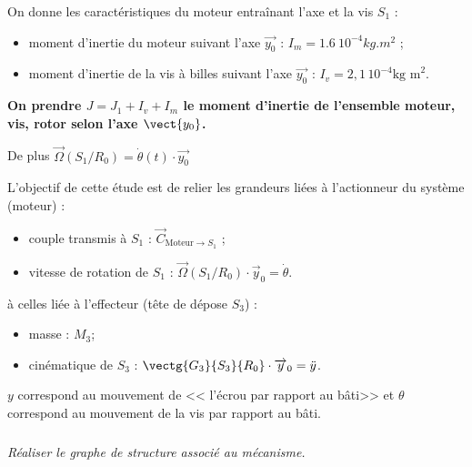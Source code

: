 \begin{multicols}{2}
On donne les caractéristiques du moteur entraînant l'axe et la vis $S_1$ :
\begin{itemize}
\item moment d'inertie du moteur suivant l'axe $\overrightarrow{y_0}$ : $I_m = \SI{1,6}{10^{-4} kg.m^2}$ ;
\item moment d'inertie de la vis à billes suivant l'axe $\overrightarrow{y_0}$ : $I_v = 2,1\,  10^{-4}\text{kg m}^2$.
\end{itemize}

\textbf{On prendre $J=J_1 + I_v + I_m$ le moment d'inertie de l'ensemble moteur, vis, rotor selon l'axe $\vect{y_0}$.}

De plus $\overrightarrow{\Omega}(S_1/R_0)=\dot{\theta}(t)\cdot \overrightarrow{y_0}$

\fi
\begin{obj}
L'objectif de cette étude est de relier les grandeurs liées à l'actionneur du système (moteur) :
\begin{itemize}
\item couple transmis à $S_1$ : $\overrightarrow{C}_{\text{Moteur}\to S_1}$ ;
\item vitesse de rotation de $S_1$ : $\overrightarrow{\Omega}(S_1/R_0)\cdot \overrightarrow{y}_0=\dot{\theta}$.
\end{itemize} 
à celles liée à l'effecteur (tête de dépose $S_3$) : 
\begin{itemize}
\item masse : $M_3$;
\item cinématique de $S_3$ : $\vectg{G_3}{S_3}{R_0}\cdot \overrightarrow{y}_0=\ddot{y}$.
\end{itemize}
\end{obj}

\begin{warn}
$y$ correspond au mouvement de << l'écrou par rapport au bâti>> et $\theta$ correspond au mouvement de la vis par rapport au bâti. 
\end{warn}



\subparagraph{}
\textit{Réaliser le graphe de structure associé au mécanisme.}


\end{multicols}
